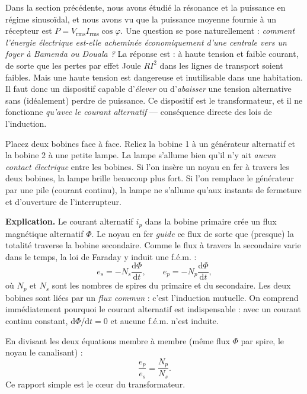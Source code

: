 \documentclass[11pt]{article}
\newcommand{\cle}[1]{{\popxbold\color{popdark}#1}}
\newcounter{popsec}
\newcounter{popsub}
\newcommand{\courssub}[1]{%
  \stepcounter{popsub}%
  \par\vspace{9pt}\noindent{\popxbold\fontsize{11.5}{13}\selectfont\color{popink}{\color{poporange}\thepopsec.\thepopsub}\hspace{6pt}#1}\par\nopagebreak\vspace{4pt}
}
\begin{document}
Dans la section précédente, nous avons étudié la résonance et la puissance en régime sinusoïdal, et nous avons vu que la puissance moyenne fournie à un récepteur est $P = V_{\mathrm{rms}} I_{\mathrm{rms}} \cos\varphi$. Une question se pose naturellement : \emph{comment l'énergie électrique est-elle acheminée économiquement d'une centrale vers un foyer à Bamenda ou Douala ?} La réponse est : à \cle{haute tension} et faible courant, de sorte que les pertes par effet Joule $RI^{2}$ dans les lignes de transport soient faibles. Mais une haute tension est dangereuse et inutilisable dans une habitation. Il faut donc un dispositif capable d'\emph{élever} ou d'\emph{abaisser} une tension alternative sans (idéalement) perdre de puissance. Ce dispositif est le \cle{transformateur}, et il ne fonctionne \emph{qu'avec le courant alternatif} --- conséquence directe des lois de l'induction.

\courssub{Principe : l'induction mutuelle}

\begin{experience}
Placez deux bobines face à face. Reliez la bobine 1 à un générateur alternatif et la bobine 2 à une petite lampe. La lampe s'allume bien qu'il n'y ait \emph{aucun contact électrique} entre les bobines. Si l'on insère un noyau en fer à travers les deux bobines, la lampe brille beaucoup plus fort. Si l'on remplace le générateur par une pile (courant continu), la lampe ne s'allume qu'aux instants de fermeture et d'ouverture de l'interrupteur.
\end{experience}

\textbf{Explication.} Le courant alternatif $i_p$ dans la \cle{bobine primaire} crée un flux magnétique alternatif $\Phi$. Le noyau en fer \emph{guide} ce flux de sorte que (presque) la totalité traverse la \cle{bobine secondaire}. Comme le flux à travers la secondaire varie dans le temps, la loi de Faraday y induit une f.é.m. :
\[ e_s = -N_s \frac{\mathrm{d}\Phi}{\mathrm{d}t}, \qquad e_p = -N_p \frac{\mathrm{d}\Phi}{\mathrm{d}t}, \]
où $N_p$ et $N_s$ sont les nombres de spires du primaire et du secondaire. Les deux bobines sont liées par un \emph{flux commun} : c'est l'\cle{induction mutuelle}. On comprend immédiatement pourquoi le courant alternatif est indispensable : avec un courant continu constant, $\mathrm{d}\Phi/\mathrm{d}t = 0$ et aucune f.é.m. n'est induite.

En divisant les deux équations membre à membre (même flux $\Phi$ par spire, le noyau le canalisant) :
\[ \frac{e_p}{e_s} = \frac{N_p}{N_s}. \]
Ce rapport simple est le cœur du transformateur.
\end{document}
